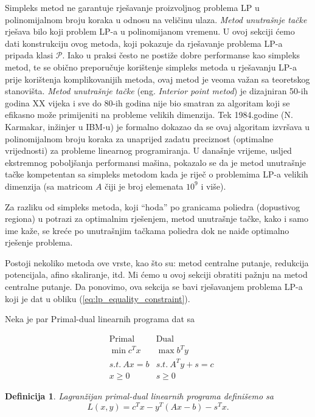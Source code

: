 \documentclass[a4paper, utf8, 11pt, colorlinks]{book}
\newtheorem{definition}{Definicija}
\begin{document}
Simpleks metod ne garantuje   rješavanje proizvoljnog problema LP u polinomijalnom broju koraka u odnosu na veličinu ulaza. %
\emph{Metod unutrašnje tačke} rješava bilo koji problem LP-a  u polinomijanom vremenu. U ovoj sekciji ćemo dati konstrukciju ovog metoda, koji pokazuje da rješavanje problema LP-a pripada klasi $\mathcal{P}$. Iako u praksi često ne postiže dobre  performanse kao simpleks metod, te se  obično  preporučuje korištenje simpleks metoda u rješavanju LP-a prije korištenja komplikovanijih metoda, ovaj metod je veoma važan sa teoretskog stanovišta.  \emph{Metod unutrašnje tačke} (eng. \emph{Interior point metod}) je dizajniran 50-ih godina XX vijeka i sve do 80-ih godina nije bio smatran za algoritam koji se efikasno može primijeniti na probleme velikih dimenzija. Tek 1984.godine (N. Karmakar, inžinjer u IBM-u) je formalno dokazao da se ovaj algoritam izvršava u polinomijalnom broju koraka za unaprijed zadatu preciznost (optimalne vrijednosti) za probleme linearnog programiranja. U današnje vrijeme, usljed ekstremnog poboljšanja performansi mašina, pokazalo se da je {metod unutrašnje tačke} kompetentan sa simpleks metodom kada je riječ o problemima LP-a  velikih dimenzija (sa matricom $A$ čiji je broj elemenata $10^9$ i više).

Za razliku od simpleks metoda, koji ``hoda'' po granicama poliedra (dopustivog regiona) u potrazi za optimalnim rješenjem, {metod unutrašnje tačke}, kako i samo ime kaže, se kreće po unutrašnjim tačkama poliedra  dok ne naiđe   optimalno rješenje problema. 

Postoji nekoliko metoda ove vrste, kao što su: metod centralne putanje, redukcija potencijala, afino skaliranje, itd. Mi ćemo u ovoj sekciji obratiti pažnju na metod centralne putanje. Da ponovimo, ova sekcija se bavi rješavanjem problema LP-a koji je dat u obliku (\ref{eq:lp_equality_constraint}). 

Neka je par Primal-dual linearnih programa dat sa

$$ \begin{array}{lll}
	&\mbox{Primal}            & \mbox{Dual}     \\
	&\min  c^T x              & \max  b^T y \\
	& {s.t.\ } Ax = b      &   {s.t.\ } A^Ty + s = c \\
	& x \geq 0                &   s \geq 0
\end{array}
$$
\begin{definition}
Lagranžijan primal-dual linearnih programa definišemo sa 
\begin{equation}
	L(x,y) = c^Tx - y^T(Ax - b) - s^T x.
\end{equation}
\end{definition}
\end{document}
